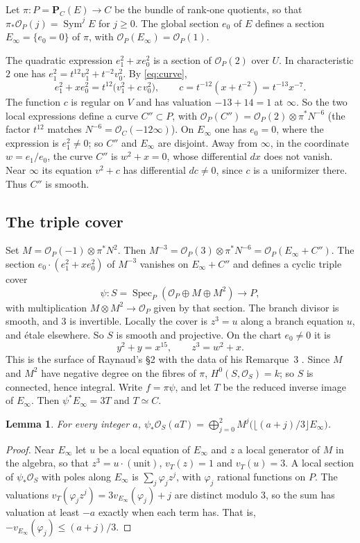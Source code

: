 \documentclass[11pt,a4paper]{article}
\theoremstyle{plain}
\newtheorem{lemma}[theorem]{Lemma}
\theoremstyle{remark}
\newcommand{\OO}{\mathcal O}
\newcommand{\PP}{\mathbf P}
\newcommand{\Sym}{\operatorname{Sym}}
\newcommand{\Spec}{\operatorname{Spec}}
\begin{document}
Let $\pi:P=\PP_C(E)\to C$ be the bundle of rank-one quotients, so that $\pi_*\OO_P(j)=\Sym^jE$ for $j\ge0$. The global
section $e_0$ of $E$ defines a section $E_\infty=\{e_0=0\}$ of $\pi$, with $\OO_P(E_\infty)=\OO_P(1)$.

The quadratic expression $e_1^2+xe_0^2$ is a section of $\OO_P(2)$ over $U$. In characteristic $2$ one has
$e_1^2=t^{12}v_1^2+t^{-2}v_0^2$. By \eqref{eq:curve},
\[
 e_1^2+xe_0^2=t^{12}\bigl(v_1^2+c\,v_0^2\bigr),\qquad c=t^{-12}(x+t^{-2})=t^{-13}x^{-7}.
\]
The function $c$ is regular on $V$ and has valuation $-13+14=1$ at $\infty$. So the two local expressions define a curve
$C''\subset P$, with $\OO_P(C'')=\OO_P(2)\otimes\pi^*N^{-6}$ (the factor $t^{12}$ matches $N^{-6}=\OO_C(-12\infty)$).
On $E_\infty$ one has $e_0=0$, where the expression is $e_1^2\ne0$; so $C''$ and $E_\infty$ are disjoint. Away from
$\infty$, in the coordinate $w=e_1/e_0$, the curve $C''$ is $w^2+x=0$, whose differential $dx$ does not vanish. Near
$\infty$ its equation $v^2+c$ has differential $dc\ne0$, since $c$ is a uniformizer there. Thus $C''$ is smooth.

\subsection{The triple cover}
Set $M=\OO_P(-1)\otimes\pi^*N^2$. Then $M^{-3}=\OO_P(3)\otimes\pi^*N^{-6}=\OO_P(E_\infty+C'')$. The section $e_0\cdot(e_1^2+xe_0^2)$ of
$M^{-3}$ vanishes on $E_\infty+C''$ and defines a cyclic triple cover
\[
 \psi:S=\Spec_P(\OO_P\oplus M\oplus M^2)\longrightarrow P,
\]
with multiplication $M\otimes M^2\to\OO_P$ given by that section. The branch divisor is smooth, and $3$ is invertible.
Locally the cover is $z^3=u$ along a branch equation $u$, and étale elsewhere. So $S$ is smooth and projective. On the
chart $e_0\ne0$ it is
\[
 y^2+y=x^{15},\qquad z^3=w^2+x .
\]
This is the surface of Raynaud's \S2 with the data of his Remarque~3 \cite[pp.~275--278]{Raynaud}. Since $M$ and $M^2$ have negative degree on the
fibres of $\pi$, $H^0(S,\OO_S)=k$; so $S$ is connected, hence integral. Write $f=\pi\psi$, and let $T$ be the reduced
inverse image of $E_\infty$. Then $\psi^*E_\infty=3T$ and $T\simeq C$.

\begin{lemma}\label{lem:floor}
For every integer $a$,
$\displaystyle\psi_*\OO_S(aT)=\bigoplus_{j=0}^2M^j\bigl(\lfloor (a+j)/3\rfloor E_\infty\bigr)$.
\end{lemma}
\begin{proof}
Near $E_\infty$ let $u$ be a local equation of $E_\infty$ and $z$ a local generator of $M$ in the algebra, so that
$z^3=u\cdot(\text{unit})$, $v_T(z)=1$ and $v_T(u)=3$. A local section of $\psi_*\OO_S$ with poles along $E_\infty$ is
$\sum_j\varphi_jz^j$, with $\varphi_j$ rational functions on $P$. The valuations $v_T(\varphi_jz^j)=3v_{E_\infty}(\varphi_j)+j$
are distinct modulo $3$, so the sum has valuation at least $-a$ exactly when each term has. That is,
$-v_{E_\infty}(\varphi_j)\le(a+j)/3$.
\end{proof}
\end{document}
